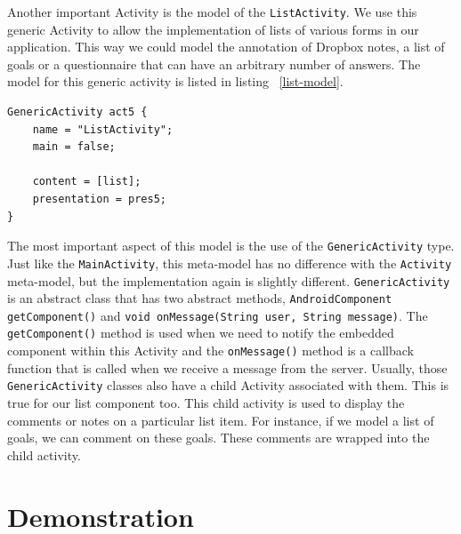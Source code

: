 Another important Activity is the model of the \texttt{ListActivity}. We use this generic Activity to allow the implementation of lists of various forms in our application. This way we could model the annotation of Dropbox notes, a list of goals or a questionnaire that can have an arbitrary number of answers. The model for this generic activity is listed in listing ~\ref{list-model}.
\begin{lstlisting}[label=list-model,caption=ListActivity model, captionpos=t]
GenericActivity act5 {
	name = "ListActivity";
	main = false;

	content = [list];
	presentation = pres5;
}
\end{lstlisting}
The most important aspect of this model is the use of the \texttt{GenericActivity} type. Just like the \texttt{MainActivity}, this meta-model has no difference with the \texttt{Activity} meta-model, but the implementation again is slightly different. \texttt{GenericActivity} is an abstract class that has two abstract methods, \texttt{AndroidComponent getComponent()} and \texttt{void onMessage(String user, String message)}. The \texttt{getComponent()} method is used when we need to notify the embedded component within this Activity and the \texttt{onMessage()} method is a callback function that is called when we receive a message from the server. Usually, those \texttt{GenericActivity} classes also have a child Activity associated with them. This is true for our list component too. This child activity is used to display the comments or notes on a particular list item. For instance, if we model a list of goals, we can comment on these goals. These comments are wrapped into the child activity.

\section{Demonstration}

